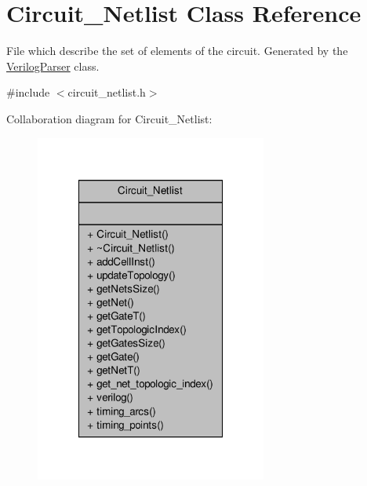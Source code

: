 \hypertarget{classCircuit__Netlist}{\section{Circuit\-\_\-\-Netlist Class Reference}
\label{classCircuit__Netlist}
}


File which describe the set of elements of the circuit. Generated by the \hyperlink{classVerilogParser}{Verilog\-Parser} class.  




{\ttfamily \#include $<$circuit\-\_\-netlist.\-h$>$}



Collaboration diagram for Circuit\-\_\-\-Netlist\-:\nopagebreak
\begin{figure}[H]
\begin{center}
\leavevmode
\includegraphics[width=216pt]{classCircuit__Netlist__coll__graph}
\end{center}
\end{figure}
